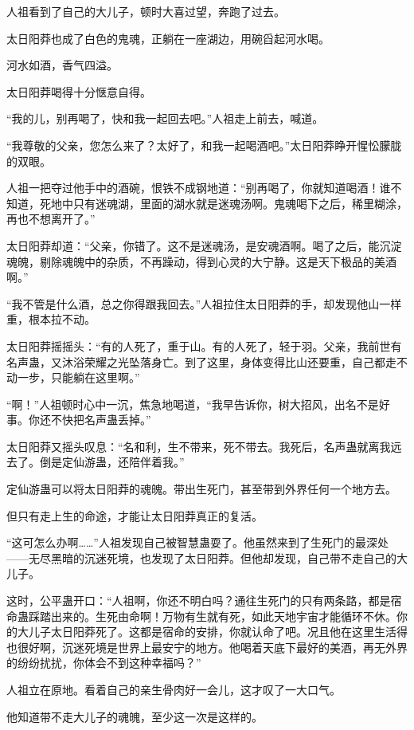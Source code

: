 
\begin{this_body}

人祖看到了自己的大儿子，顿时大喜过望，奔跑了过去。

太日阳莽也成了白色的鬼魂，正躺在一座湖边，用碗舀起河水喝。

河水如酒，香气四溢。

太日阳莽喝得十分惬意自得。

“我的儿，别再喝了，快和我一起回去吧。”人祖走上前去，喊道。

“我尊敬的父亲，您怎么来了？太好了，和我一起喝酒吧。”太日阳莽睁开惺忪朦胧的双眼。

人祖一把夺过他手中的酒碗，恨铁不成钢地道：“别再喝了，你就知道喝酒！谁不知道，死地中只有迷魂湖，里面的湖水就是迷魂汤啊。鬼魂喝下之后，稀里糊涂，再也不想离开了。”

太日阳莽却道：“父亲，你错了。这不是迷魂汤，是安魂酒啊。喝了之后，能沉淀魂魄，剔除魂魄中的杂质，不再躁动，得到心灵的大宁静。这是天下极品的美酒啊。”

“我不管是什么酒，总之你得跟我回去。”人祖拉住太日阳莽的手，却发现他山一样重，根本拉不动。

太日阳莽摇摇头：“有的人死了，重于山。有的人死了，轻于羽。父亲，我前世有名声蛊，又沐浴荣耀之光坠落身亡。到了这里，身体变得比山还要重，自己都走不动一步，只能躺在这里啊。”

“啊！”人祖顿时心中一沉，焦急地喝道，“我早告诉你，树大招风，出名不是好事。你还不快把名声蛊丢掉。”

太日阳莽又摇头叹息：“名和利，生不带来，死不带去。我死后，名声蛊就离我远去了。倒是定仙游蛊，还陪伴着我。”

定仙游蛊可以将太日阳莽的魂魄。带出生死门，甚至带到外界任何一个地方去。

但只有走上生的命途，才能让太日阳莽真正的复活。

“这可怎么办啊……”人祖发现自己被智慧蛊耍了。他虽然来到了生死门的最深处——无尽黑暗的沉迷死境，也发现了太日阳莽。但他却发现，自己带不走自己的大儿子。

这时，公平蛊开口：“人祖啊，你还不明白吗？通往生死门的只有两条路，都是宿命蛊踩踏出来的。生死由命啊！万物有生就有死，如此天地宇宙才能循环不休。你的大儿子太日阳莽死了。这都是宿命的安排，你就认命了吧。况且他在这里生活得也很好啊，沉迷死境是世界上最安宁的地方。他喝着天底下最好的美酒，再无外界的纷纷扰扰，你体会不到这种幸福吗？”

人祖立在原地。看着自己的亲生骨肉好一会儿，这才叹了一大口气。

他知道带不走大儿子的魂魄，至少这一次是这样的。


\end{this_body}
